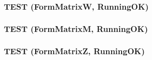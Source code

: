 \subsubsection{\setlength{\rightskip}{0pt plus 5cm}TEST (Form\-Matrix\-W, Running\-OK)}\label{formMatrix__test_8cpp_7c686c6882fe8c809a6d9c39c0561811}


\subsubsection{\setlength{\rightskip}{0pt plus 5cm}TEST (Form\-Matrix\-M, Running\-OK)}\label{formMatrix__test_8cpp_d4702ec8a85f556122c982bb219b4b46}


\subsubsection{\setlength{\rightskip}{0pt plus 5cm}TEST (Form\-Matrix\-Z, Running\-OK)}\label{formMatrix__test_8cpp_7dad1cdab5ee1925f1082eceb788feed}



